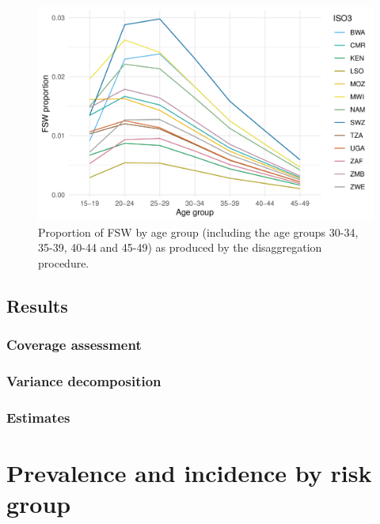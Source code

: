 \documentclass[a4paper, nobind]{templates/ociamthesis}
\begin{document}
\begin{figure}

{\centering \includegraphics[width=0.9\linewidth]{figures/multi-agyw/age-disagg-fsw-line} 

}

\caption{Proportion of FSW by age group (including the age groups 30-34, 35-39, 40-44 and 45-49) as produced by the disaggregation procedure.}\label{fig:age-disagg-fsw-line}
\end{figure}

\hypertarget{results-2}{%
\subsection{Results}\label{results-2}}

\hypertarget{coverage-assessment-1}{%
\subsubsection{Coverage assessment}\label{coverage-assessment-1}}

\hypertarget{variance-decomposition}{%
\subsubsection{Variance decomposition}\label{variance-decomposition}}

\hypertarget{estimates}{%
\subsubsection{Estimates}\label{estimates}}

\hypertarget{prevalence-and-incidence-by-risk-group}{%
\section{Prevalence and incidence by risk group}\label{prevalence-and-incidence-by-risk-group}}
\end{document}
